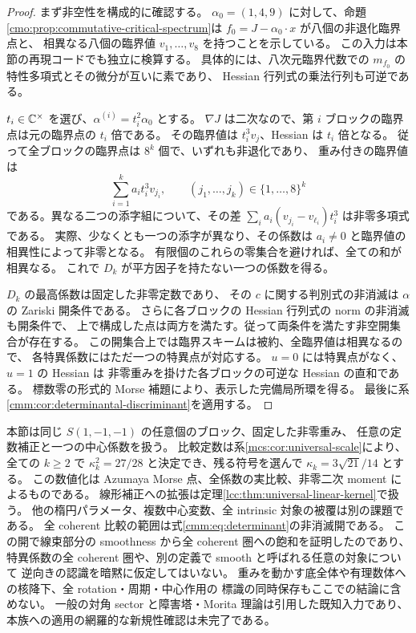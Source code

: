 \begin{proof}
まず非空性を構成的に確認する。
$\alpha_0=(1,4,9)$ に対して、命題\ref{cmo:prop:commutative-critical-spectrum}は
$f_0=J-\alpha_0\cdot x$ が八個の非退化臨界点と、
相異なる八個の臨界値 $v_1,\ldots,v_8$ を持つことを示している。
この入力は本節の再現コードでも独立に検算する。
具体的には、八次元臨界代数での $m_{f_0}$ の特性多項式とその微分が互いに素であり、
Hessian 行列式の乗法行列も可逆である。

$t_i\in\mathbb C^\times$ を選び、$\alpha^{(i)}=t_i^2\alpha_0$ とする。
$\nabla J$ は二次なので、第 $i$ ブロックの臨界点は元の臨界点の $t_i$ 倍である。
その臨界値は $t_i^3v_j$、Hessian は $t_i$ 倍となる。
従って全ブロックの臨界点は $8^k$ 個で、いずれも非退化であり、
重み付きの臨界値は
\[
 \sum_{i=1}^k a_it_i^3v_{j_i},\qquad
                   (j_1,\ldots,j_k)\in\{1,\ldots,8\}^k
\]
である。異なる二つの添字組について、その差
$\sum_i a_i(v_{j_i}-v_{\ell_i})t_i^3$ は非零多項式である。
実際、少なくとも一つの添字が異なり、その係数は
$a_i\ne0$ と臨界値の相異性によって非零となる。
有限個のこれらの零集合を避ければ、全ての和が相異なる。
これで $D_k$ が平方因子を持たない一つの係数を得る。

$D_k$ の最高係数は固定した非零定数であり、
その $c$ に関する判別式の非消滅は $\alpha$ の Zariski 開条件である。
さらに各ブロックの Hessian 行列式の norm の非消滅も開条件で、
上で構成した点は両方を満たす。従って両条件を満たす非空開集合が存在する。
この開集合上では臨界スキームは被約、全臨界値は相異なるので、
各特異係数にはただ一つの特異点が対応する。
$u=0$ には特異点がなく、$u=1$ の Hessian は
非零重みを掛けた各ブロックの可逆な Hessian の直和である。
標数零の形式的 Morse 補題により、表示した完備局所環を得る。
最後に系\ref{cmm:cor:determinantal-discriminant}を適用する。
\end{proof}

\begin{remark}[本節で決定した範囲]
\label{cmm:rem:scope}
本節は同じ $S(1,-1,-1)$ の任意個のブロック、固定した非零重み、
任意の定数補正と一つの中心係数を扱う。
比較定数は系\ref{mcs:cor:universal-scale}により、全ての $k\ge2$ で
$\kappa_k^2=27/28$ と決定でき、残る符号を選んで $\kappa_k=3\sqrt{21}/14$ とする。
この数値化は Azumaya Morse 点、全係数の実比較、非零二次 moment によるものである。
線形補正への拡張は定理\ref{lcc:thm:universal-linear-kernel}で扱う。
他の楕円パラメータ、複数中心変数、全 intrinsic 対象の被覆は別の課題である。
全 coherent 比較の範囲は式\eqref{cmm:eq:determinant}の非消滅開である。
この開で線束部分の smoothness から全 coherent 圏への飽和を証明したのであり、
特異係数の全 coherent 圏や、別の定義で smooth と呼ばれる任意の対象について
逆向きの認識を暗黙に仮定してはいない。
重みを動かす底全体や有理数体への核降下、全 rotation・周期・中心作用の
標識の同時保存もここでの結論に含めない。
一般の対角 sector と障害塔・Morita 理論は引用した既知入力であり、
本族への適用の網羅的な新規性確認は未完了である。
\end{remark}
